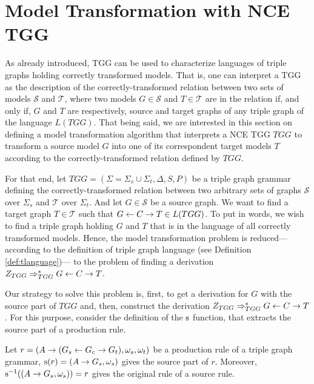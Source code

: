 \documentclass[runningheads]{llncs}
\begin{document}
\section{Model Transformation with NCE TGG}
\label{sec:modeltrans}
As already introduced, TGG can be used to characterize languages of triple graphs holding correctly transformed models. That is, one can interpret a TGG as the description of the correctly-transformed relation between two sets of models $\mathcal{S}$ and $\mathcal{T}$, where two models $G \in \mathcal{S}$ and $T \in \mathcal{T}$ are in the relation if, and only if, $G$ and $T$ are respectively, source and target graphs of any triple graph of the language $L(TGG)$. That being said, we are interested in this section on defining a model transformation algorithm that interprets a NCE TGG $TGG$ to transform a source model $G$ into one of its correspondent target models $T$ according to the correctly-transformed relation defined by $TGG$.

For that end, let $TGG = (\Sigma = \Sigma_s \cup \Sigma_t, \Delta, S, P)$ be a triple graph grammar defining the correctly-transformed relation between two arbitrary sets of graphs $\mathcal{S}$ over $\Sigma_s$ and $\mathcal{T}$ over $\Sigma_t$. And let $G \in \mathcal{S}$ be a source graph. We want to find a target graph $T \in \mathcal{T}$ such that $G \overset{}{\leftarrow} C \overset{}{\rightarrow} T \in L(TGG)$. To put in words, we wish to find a triple graph holding $G$ and $T$ that is in the language of all correctly transformed models. Hence, the model transformation problem is reduced--- according to the definition of triple graph language (see Definition \ref{def:tlanguage})--- to the problem of finding a derivation $Z_{TGG} \Rightarrow^*_{TGG} G \overset{}{\leftarrow} C \overset{}{\rightarrow} T$.

Our strategy to solve this problem is, first, to get a derivation for $G$ with the source part of $TGG$ and, then, construct the derivation $Z_{TGG} \Rightarrow^*_{TGG} G \overset{}{\leftarrow} C \overset{}{\rightarrow} T$. For this purpose, consider the definition of the $\operatorname{s}$ function, that extracts the source part of a production rule.

\begin{definition}
	\label{def:source}
	Let $r = (A \to (G_s \overset{}{\leftarrow} G_c \overset{}{\rightarrow} G_t), \omega_s, \omega_t)$ be a production rule of a triple graph grammar, $\operatorname{s}(r) = (A \to G_s,\omega_s)$ gives the source part of $r$. Moreover, $\operatorname{s}^{-1}((A \to G_s,\omega_s)) = r$ gives the original rule of a source rule.
\end{definition}
\end{document}
